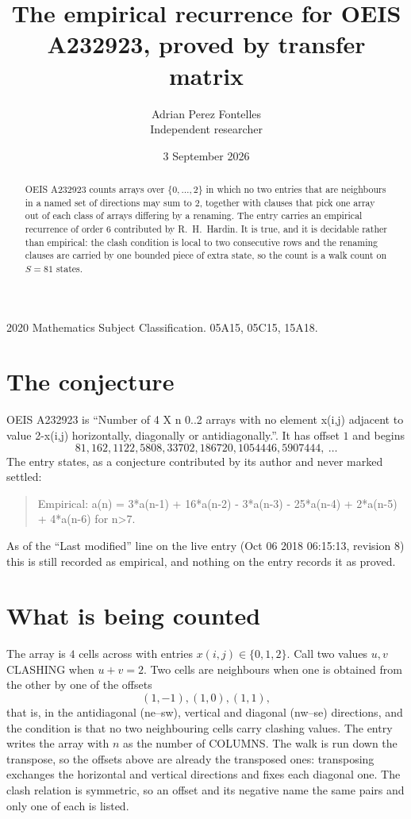 \documentclass[11pt,a4paper]{article}
\title{The empirical recurrence for OEIS A232923, proved by transfer matrix}
\author{Adrian Perez Fontelles\\ \small Independent researcher}
\date{3 September 2026}
\theoremstyle{plain}
\theoremstyle{definition}
\begin{document}
\maketitle

\begin{abstract}
OEIS A232923 counts arrays over $\{0,\dots,2\}$ in which no two entries that are neighbours in
a named set of directions may sum to $2$, together with clauses that pick one array out of
each class of arrays differing by a renaming. The entry carries an empirical recurrence of
order $6$ contributed by R.~H.~Hardin. It is true, and it is decidable rather than
empirical: the clash condition is local to two consecutive rows and the renaming clauses are
carried by one bounded piece of extra state, so the count is a walk count on $S=81$ states.
\end{abstract}

\noindent\small 2020 Mathematics Subject Classification. 05A15, 05C15, 15A18.\normalsize

\section{The conjecture}

OEIS A232923 is ``Number of 4 X n 0..2 arrays with no element x(i,j) adjacent to value 2-x(i,j) horizontally, diagonally or antidiagonally.''. It has offset $1$ and begins
\[
81, 162, 1122, 5808, 33702, 186720, 1054446, 5907444,\ \dots
\]
The entry states, as a conjecture contributed by its author and never marked settled:
\begin{quote}
Empirical: a(n) = 3*a(n-1) + 16*a(n-2) - 3*a(n-3) - 25*a(n-4) + 2*a(n-5) + 4*a(n-6) for n>7.
\end{quote}
As of the ``Last modified'' line on the live entry (Oct 06 2018 06:15:13, revision 8) this is still
recorded as empirical, and nothing on the entry records it as proved.

\section{What is being counted}

The array is $4$ cells across with entries $x(i,j)\in\{0,1,2\}$. Call two values $u,v$ CLASHING
when $u+v=2$. Two cells are neighbours when one is obtained from the other by one of
the offsets
\[
(1,-1), (1,0), (1,1),
\]
that is, in the antidiagonal (ne--sw), vertical and diagonal (nw--se) directions, and the condition is that no two neighbouring cells carry
clashing values. The entry writes the array with $n$ as the number of COLUMNS. The walk is run down the transpose, so the offsets above are already the transposed ones: transposing exchanges the horizontal and vertical directions and fixes each diagonal one. The clash relation is symmetric, so an offset and its negative name the
same pairs and only one of each is listed.
\end{document}
